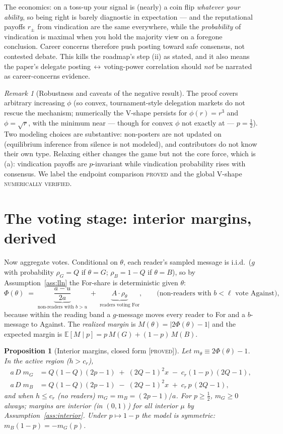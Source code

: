 \documentclass[11pt]{article}
\newtheorem{proposition}{Proposition}
\theoremstyle{remark}
\newtheorem{remark}{Remark}
\newcommand{\E}{\mathbb{E}}
\newcommand{\statusP}{\textsc{[proved]}}
\begin{document}
The economics: on a toss-up your signal is (nearly) a coin flip \emph{whatever
your ability}, so being right is barely diagnostic in expectation --- and the
reputational payoffs $r_\pm$ from vindication are the same everywhere, while the
\emph{probability} of vindication is maximal when you hold the majority view on
a foregone conclusion. Career concerns therefore push posting toward safe
consensus, not contested debate. This kills the roadmap's step (ii) as stated,
and it also means the paper's delegate posting$\,\leftrightarrow\,$voting-power
correlation should \emph{not} be narrated as career-concerns evidence.

\begin{remark}[Robustness and caveats of the negative result]
The proof covers arbitrary increasing $\phi$ (so convex, tournament-style
delegation markets do not rescue the mechanism; numerically the V-shape persists
for $\phi(r)=r^3$ and $\phi=\sqrt{r}$, with the minimum near --- though for
convex $\phi$ not exactly at --- $p=\tfrac12$). Two modeling choices are
substantive: non-posters are not updated on (equilibrium inference from silence
is not modeled), and contributors do not know their own type. Relaxing either
changes the game but not the core force, which is (a): vindication payoffs are
$p$-invariant while vindication probability rises with consensus. We label the
endpoint comparison \textsc{proved} and the global V-shape
\textsc{numerically verified}.
\end{remark}

\section{The voting stage: interior margins, derived}
\label{sec:margin}

Now aggregate votes. Conditional on $\theta$, each reader's sampled message is
i.i.d.\ ($g$ with probability $\rho_G=Q$ if $\theta=G$; $\rho_B=1-Q$ if
$\theta=B$), so by Assumption~\ref{ass:lln} the For-share is deterministic given
$\theta$:
\[
\Phi(\theta)\;=\;\underbrace{\frac{a-u}{2a}}_{\text{non-readers with }b>u}
\;+\;\underbrace{A\cdot\rho_\theta}_{\text{readers voting For}},
\qquad\text{(non-readers with }b<\ell\text{ vote Against),}
\]
because within the reading band a $g$-message moves every reader to For and a
$b$-message to Against. The \emph{realized margin} is
$M(\theta)=|2\Phi(\theta)-1|$ and the expected margin is
$\E[M\mid p]=p\,M(G)+(1-p)\,M(B)$.

\begin{proposition}[Interior margins, closed form \statusP]\label{prop:margin}
Let $m_\theta\equiv2\Phi(\theta)-1$. In the active region ($h>c_r$),
\begin{align}
a\,D\;m_G&=Q(1-Q)(2p-1)\;+\;(2Q-1)^2x\;-\;c_r(1-p)(2Q-1),\label{eq:mG}\\
a\,D\;m_B&=Q(1-Q)(2p-1)\;-\;(2Q-1)^2x\;+\;c_r\,p\,(2Q-1),\label{eq:mB}
\end{align}
and when $h\le c_r$ (no readers) $m_G=m_B=(2p-1)/a$. For $p\ge\tfrac12$,
$m_G\ge0$ always; margins are interior (in $(0,1)$) for all interior $\mu$ by
Assumption~\ref{ass:interior}. Under $p\mapsto1-p$ the model is symmetric:
$m_B(1-p)=-m_G(p)$.
\end{proposition}
\end{document}
